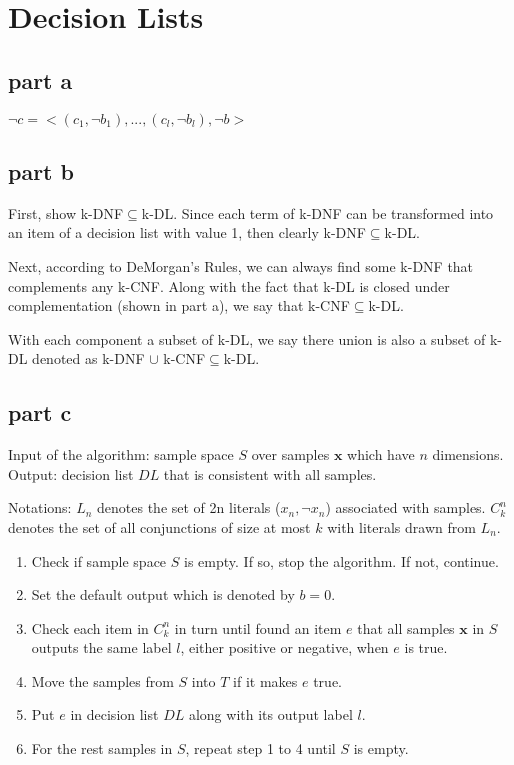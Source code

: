 \section{Decision Lists}

\subsection{part a}
$\neg{c} = <(c_1,\neg{b_1}), ..., (c_l, \neg{b_l}), \neg{b}>$

\subsection{part b}
First, show k-DNF$\subseteq$k-DL. Since each term of k-DNF can be transformed into an item of a decision list with value 1, then clearly k-DNF$\subseteq$k-DL.

Next, according to DeMorgan's Rules, we can always find some k-DNF that complements any k-CNF. Along with the fact that k-DL is closed under complementation (shown in part a), we say that k-CNF$\subseteq$k-DL.

With each component a subset of k-DL, we say there union is also a subset of k-DL denoted as k-DNF $\cup$ k-CNF$\subseteq$k-DL.

\subsection{part c}
Input of the algorithm: sample space $S$ over samples $\textbf{x}$ which have $n$ dimensions. Output: decision list $DL$ that is consistent with all samples.

Notations: $L_n$ denotes the set of 2n literals ($x_n, \neg{x_n}$) associated with samples. $C_k^n$ denotes the set of all conjunctions of size at most $k$ with literals drawn from $L_n$.

\begin{enumerate}
\item Check if sample space $S$ is empty. If so, stop the algorithm. If not, continue.
\item Set the default output which is denoted by $b = 0$.
\item Check each item in $C_k^n$ in turn until found an item $e$ that all samples $\textbf{x}$ in $S$ outputs the same label $l$, either positive or negative, when $e$ is true.
\item Move the samples from $S$ into $T$ if it makes $e$ true.
\item Put $e$ in decision list $DL$ along with its output label $l$.
\item For the rest samples in $S$, repeat step 1 to 4 until $S$ is empty.
\end{enumerate}

